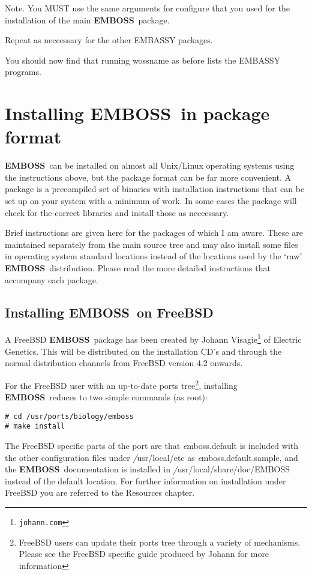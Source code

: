 \documentclass{report}
\newcommand{\filename}[1]{{\sf\textsl #1}}
\newcommand{\progname}[1]{{\sc #1}}
\newcommand{\URL}[1]{\footnote{{\tt #1}}}
\newcommand{\EMBOSS}{{\sf\bfseries EMBOSS}}
\begin{document}
Note. You MUST use the same arguments for configure that you used for the installation of the main \EMBOSS\ package.

Repeat as neccessary for the other EMBASSY packages.
 
You should now find that running \progname{wossname} as before lists the EMBASSY programs.

\section{Installing \EMBOSS\ in package format}
\label{sec:FreeBSD}
\EMBOSS\ can be installed on almost all Unix/Linux operating systems using the instructions above, but the package format can be far more convenient. 
A package is a precompiled set of binaries with installation instructions that can be set up on your system with a minimum of work. In some cases the package will check for the correct libraries and install those as neccessary.

Brief instructions are given here for the packages of which I am aware. These are maintained separately from the main source tree and may also install some files in operating system standard locations instead of the locations used by the `raw' \EMBOSS\ distribution. Please read the more detailed instructions that accompany each package.

\subsection{Installing \EMBOSS\ on FreeBSD}

A FreeBSD \EMBOSS\ package has been created by Johann Visagie\URL{johann\@@egenetics.com} of Electric Genetics. This will be distributed on the installation CD's and through the normal distribution channels from FreeBSD version 4.2 onwards.

For the FreeBSD user with an up-to-date ports tree\footnote{FreeBSD users can update their ports tree through a variety of mechanisms. Please see the FreeBSD specific guide produced by Johann for more information}, installing \EMBOSS\
reduces to two simple commands (as root):
\begin{verbatim}
# cd /usr/ports/biology/emboss
# make install
\end{verbatim}

The FreeBSD specific parts of the port are that \filename{emboss.default} is included with the other configuration files under \filename{/usr/local/etc} as \filename{emboss.default.sample}, and the \EMBOSS\ documentation is installed in \filename{/usr/local/share/doc/EMBOSS} instead of the default location.
For further information on installation under FreeBSD you are referred to the Resources chapter.
\end{document}
